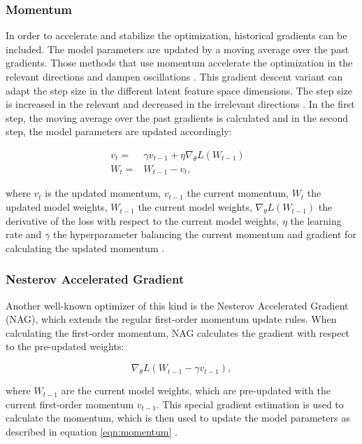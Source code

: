 \subsubsection{Momentum}
In order to accelerate and stabilize the optimization, historical gradients can be included. The model parameters are updated by a moving average over the past gradients. Those methods that use momentum accelerate the optimization in the relevant directions and dampen oscillations \cite{Ruder2016}. This gradient descent variant can adapt the step size in the different latent feature space dimensions. The step size is increased in the relevant and decreased in the irrelevant directions \cite{Ruder2016}. In the first step, the moving average over the past gradients is calculated and in the second step, the model parameters are updated accordingly:

    \begin{equation}
      \begin{aligned}
          v_{t} = & \gamma v_{t-1} +  \eta \nabla_{\theta}L(W_{t-1}) &\\
          W_{t} = &W_{t-1} - v_{t},
          \label{eqn:momentum}
      \end{aligned}
    \end{equation}

where $v_{t}$ is the updated momentum, $v_{t-1}$ the current momentum, $W_{t}$ the updated model weights, $W_{t-1}$ the current model weights, $\nabla_{\theta}L(W_{t-1})$ the derivative of the loss with respect to the current model weights, $\eta$ the learning rate and $\gamma$ the hyperparameter balancing the current momentum and gradient for calculating the updated momentum \cite{Ruder2016}.


\subsubsection{Nesterov Accelerated Gradient}
Another well-known optimizer of this kind is the Nesterov Accelerated Gradient (NAG), which extends the regular first-order momentum update rules. When calculating the first-order momentum, NAG calculates the gradient with respect to the pre-updated weights: 

\begin{equation}
    \nabla_{\theta}L( W_{t-1} - \gamma v_{t-1}),
\end{equation}
    
where $W_{t-1}$ are the current model weights, which are pre-updated with the current first-order momentum $v_{t-1}$. This special gradient estimation is used to calculate the momentum, which is then used to update the model parameters as described in equation \ref{eqn:momentum} \cite{Ruder2016}.

